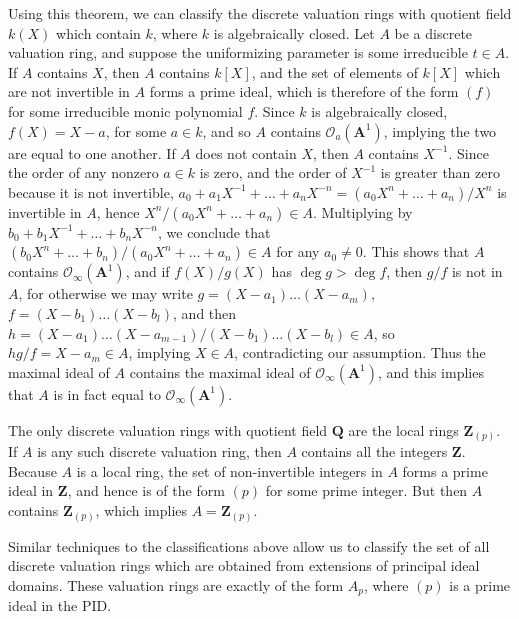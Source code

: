 \begin{example}
    Using this theorem, we can classify the discrete valuation rings with quotient field $k(X)$ which contain $k$, where $k$ is algebraically closed. Let $A$ be a discrete valuation ring, and suppose the uniformizing parameter is some irreducible $t \in A$. If $A$ contains $X$, then $A$ contains $k[X]$, and the set of elements of $k[X]$ which are not invertible in $A$ forms a prime ideal, which is therefore of the form $(f)$ for some irreducible monic polynomial $f$. Since $k$ is algebraically closed, $f(X) = X - a$, for some $a \in k$, and so $A$ contains $\mathcal{O}_a(\mathbf{A}^1)$, implying the two are equal to one another. If $A$ does not contain $X$, then $A$ contains $X^{-1}$. Since the order of any nonzero $a \in k$ is zero, and the order of $X^{-1}$ is greater than zero because it is not invertible, $a_0 + a_1X^{-1} + \dots + a_nX^{-n} = (a_0X^n + \dots + a_n)/X^n$ is invertible in $A$, hence $X^n/(a_0X^n + \dots + a_n) \in A$. Multiplying by $b_0 + b_1X^{-1} + \dots + b_nX^{-n}$, we conclude that $(b_0X^n + \dots + b_n)/(a_0X^n + \dots + a_n) \in A$ for any $a_0 \neq 0$. This shows that $A$ contains $\mathcal{O}_\infty(\mathbf{A}^1)$, and if $f(X)/g(X)$ has $\deg g > \deg f$, then $g/f$ is not in $A$, for otherwise we may write $g = (X-a_1) \dots (X-a_m)$, $f = (X-b_1) \dots (X - b_l)$, and then $h = (X-a_1) \dots (X-a_{m-1})/(X-b_1) \dots (X-b_l) \in A$, so $hg/f = X - a_m \in A$, implying $X \in A$, contradicting our assumption. Thus the maximal ideal of $A$ contains the maximal ideal of $\mathcal{O}_\infty(\mathbf{A}^1)$, and this implies that $A$ is in fact equal to $\mathcal{O}_\infty(\mathbf{A}^1)$.
\end{example}

\begin{example}
    The only discrete valuation rings with quotient field $\mathbf{Q}$ are the local rings $\mathbf{Z}_{(p)}$. If $A$ is any such discrete valuation ring, then $A$ contains all the integers $\mathbf{Z}$. Because $A$ is a local ring, the set of non-invertible integers in $A$ forms a prime ideal in $\mathbf{Z}$, and hence is of the form $(p)$ for some prime integer. But then $A$ contains $\mathbf{Z}_{(p)}$, which implies $A = \mathbf{Z}_{(p)}$.
\end{example}

Similar techniques to the classifications above allow us to classify the set of all discrete valuation rings which are obtained from extensions of principal ideal domains. These valuation rings are exactly of the form $A_p$, where $(p)$ is a prime ideal in the PID.



